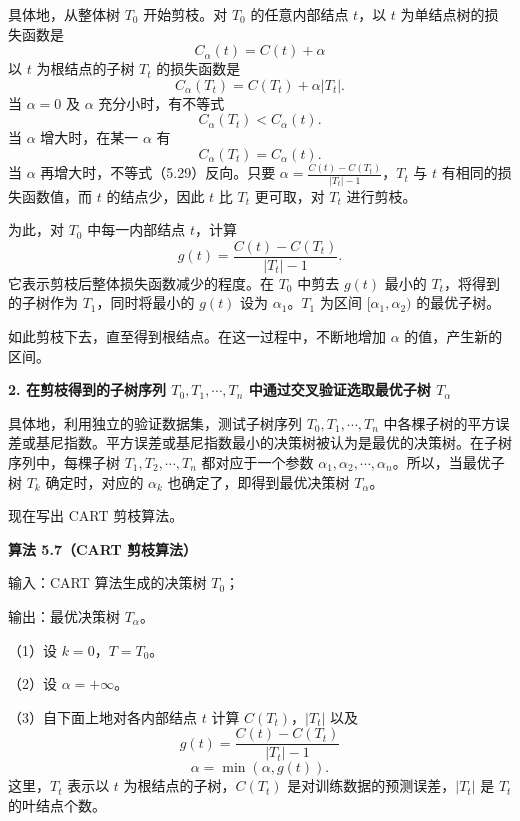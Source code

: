 \documentclass[UTF8,12pt,a4paper,fontset=fandol]{ctexart}
\begin{document}
具体地，从整体树 $T_0$ 开始剪枝。对 $T_0$ 的任意内部结点 $t$，以 $t$ 为单结点树的损失函数是
\begin{equation}
  C_\alpha(t)=C(t)+\alpha
  \tag{5.27}
\end{equation}
以 $t$ 为根结点的子树 $T_t$ 的损失函数是
\begin{equation}
  C_\alpha(T_t)=C(T_t)+\alpha|T_t|.
  \tag{5.28}
\end{equation}
当 $\alpha=0$ 及 $\alpha$ 充分小时，有不等式
\begin{equation}
  C_\alpha(T_t)<C_\alpha(t).
  \tag{5.29}
\end{equation}
当 $\alpha$ 增大时，在某一 $\alpha$ 有
\begin{equation}
  C_\alpha(T_t)=C_\alpha(t).
  \tag{5.30}
\end{equation}
当 $\alpha$ 再增大时，不等式（5.29）反向。只要 $\alpha=\frac{C(t)-C(T_t)}{|T_t|-1}$，$T_t$ 与 $t$ 有相同的损失函数值，而 $t$ 的结点少，因此 $t$ 比 $T_t$ 更可取，对 $T_t$ 进行剪枝。

为此，对 $T_0$ 中每一内部结点 $t$，计算
\begin{equation}
  g(t)=\frac{C(t)-C(T_t)}{|T_t|-1}.
  \tag{5.31}
\end{equation}
它表示剪枝后整体损失函数减少的程度。在 $T_0$ 中剪去 $g(t)$ 最小的 $T_t$，将得到的子树作为 $T_1$，同时将最小的 $g(t)$ 设为 $\alpha_1$。$T_1$ 为区间 $[\alpha_1,\alpha_2)$ 的最优子树。

如此剪枝下去，直至得到根结点。在这一过程中，不断地增加 $\alpha$ 的值，产生新的区间。

\noindent\textbf{2. 在剪枝得到的子树序列 $T_0,T_1,\cdots,T_n$ 中通过交叉验证选取最优子树 $T_\alpha$}

具体地，利用独立的验证数据集，测试子树序列 $T_0,T_1,\cdots,T_n$ 中各棵子树的平方误差或基尼指数。平方误差或基尼指数最小的决策树被认为是最优的决策树。在子树序列中，每棵子树 $T_1,T_2,\cdots,T_n$ 都对应于一个参数 $\alpha_1,\alpha_2,\cdots,\alpha_n$。所以，当最优子树 $T_k$ 确定时，对应的 $\alpha_k$ 也确定了，即得到最优决策树 $T_\alpha$。

现在写出 CART 剪枝算法。

\noindent\textbf{算法 5.7（CART 剪枝算法）}

输入：CART 算法生成的决策树 $T_0$；

输出：最优决策树 $T_\alpha$。

（1）设 $k=0$，$T=T_0$。

（2）设 $\alpha=+\infty$。

（3）自下面上地对各内部结点 $t$ 计算 $C(T_t)$，$|T_t|$ 以及
\[
  g(t)=\frac{C(t)-C(T_t)}{|T_t|-1}
\]
\[
  \alpha=\min(\alpha,g(t)).
\]
这里，$T_t$ 表示以 $t$ 为根结点的子树，$C(T_t)$ 是对训练数据的预测误差，$|T_t|$ 是 $T_t$ 的叶结点个数。
\end{document}
